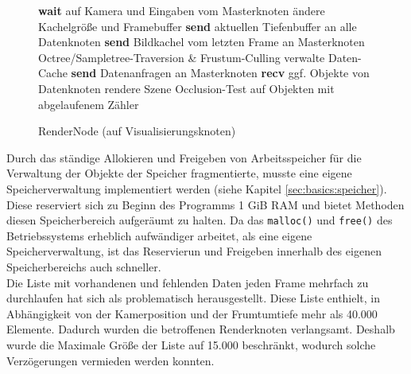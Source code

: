 \begin{figure}[ttt!]
\centering
 \begin{minipage}[t]{12cm}
\begin{algorithm}[H]
  \caption{RenderNode (auf Visualisierungsknoten)\label{alg:impl:rendernode}} 
    \begin{algorithmic} [1]
      \LOOP
	\STATE \textbf{wait} auf Kamera und Eingaben vom Masterknoten
	  \STATE ändere Kachelgröße und Framebuffer
	  \STATE \textbf{send} aktuellen Tiefenbuffer an alle Datenknoten
	\ENDIF
	\STATE \textbf{send} Bildkachel vom letzten Frame an Masterknoten
	\STATE Octree/Sampletree-Traversion \& Frustum-Culling
	\STATE verwalte Daten-Cache
	\STATE \textbf{send} Datenanfragen an Masterknoten
	\STATE \textbf{recv} ggf. Objekte von Datenknoten
	\STATE rendere Szene
	\STATE Occlusion-Test auf Objekten mit abgelaufenem Zähler
      \ENDLOOP
    \end{algorithmic}
\end{algorithm}
 \end{minipage}
\end{figure}
Durch das ständige Allokieren und Freigeben von Arbeitsspeicher für die Verwaltung der Objekte der Speicher fragmentierte, musste eine eigene Speicherverwaltung implementiert werden (siehe Kapitel \ref{sec:basics:speicher}). Diese reserviert sich zu Beginn des Programms 1 GiB RAM und bietet Methoden diesen Speicherbereich aufgeräumt zu halten. Da das \verb|malloc()| und \verb|free()| des Betriebssystems erheblich aufwändiger arbeitet, als eine eigene Speicherverwaltung, ist das Reservierun und Freigeben innerhalb des eigenen Speicherbereichs auch schneller.\\
Die Liste mit vorhandenen und fehlenden Daten jeden Frame mehrfach zu durchlaufen hat sich als problematisch herausgestellt. Diese Liste enthielt, in Abhängigkeit von der Kamerposition und der Frumtumtiefe mehr als 40.000 Elemente. Dadurch wurden die betroffenen Renderknoten verlangsamt. Deshalb wurde die Maximale Größe der Liste auf 15.000 beschränkt, wodurch solche Verzögerungen vermieden werden konnten.

